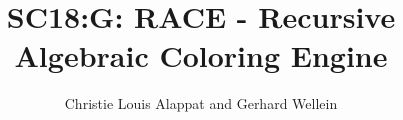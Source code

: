 \documentclass[sigplan]{acmart}
\begin{document}
	
	\title[RACE]{SC18:G: RACE - Recursive Algebraic Coloring Engine}
	
	\author{Christie Louis Alappat and Gerhard Wellein} 
	
	
	
	
	
	
	
	
	
	\renewcommand{\shortauthors}{C. Alappat}
	
	

	
	
	
	
	
	\maketitle
	
	
	
	\balance
	
	
	
\end{document}
